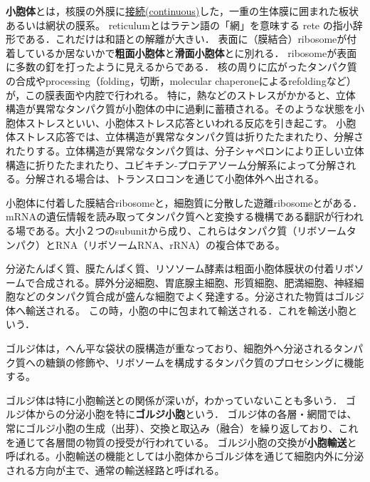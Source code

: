 \documentclass[uplatex, dvipdfmx]{jsreport}
\begin{document}
\begin{definition}
    \textbf{小胞体}とは，核膜の外膜に\underline{接続(continuous)}した，一重の生体膜に囲まれた板状あるいは網状の膜系。
    reticulumとはラテン語の「網」を意味する rete の指小辞形である．これだけは和語との解離が大きい．
    表面に（膜結合）ribosomeが付着しているか居ないかで\textbf{粗面小胞体}と\textbf{滑面小胞体}とに別れる．
    ribosomeが表面に多数の釘を打ったように見えるからである．
    核の周りに広がったタンパク質の合成やprocessing（folding，切断，molecular chaperoneによるrefoldingなど）が，この膜表面や内腔で行われる。
    特に，熱などのストレスがかかると、立体構造が異常なタンパク質が小胞体の中に過剰に蓄積される。そのような状態を小胞体ストレスといい、小胞体ストレス応答といわれる反応を引き起こす。
    小胞体ストレス応答では、立体構造が異常なタンパク質は折りたたまれたり、分解されたりする。立体構造が異常なタンパク質は、分子シャペロンにより正しい立体構造に折りたたまれたり、ユビキチン-プロテアソーム分解系によって分解される。分解される場合は、トランスロコンを通じて小胞体外へ出される。
\end{definition}
\begin{definition}
    小胞体に付着した膜結合ribosomeと，細胞質に分散した遊離ribosomeとがある．
    mRNAの遺伝情報を読み取ってタンパク質へと変換する機構である翻訳が行われる場である。大小２つのsubunitから成り、これらはタンパク質（リボソームタンパク）とRNA（リボソームRNA、rRNA）の複合体である。
\end{definition}

\begin{definition}[輸送小胞]
    分泌たんぱく質、膜たんぱく質、リソソーム酵素は粗面小胞体膜状の付着リボソームで合成される。膵外分泌細胞、胃底腺主細胞、形質細胞、肥満細胞、神経細胞などのタンパク質合成が盛んな細胞でよく発達する。分泌された物質はゴルジ体へ輸送される。
    この時，小胞の中に包まれて輸送される．これを輸送小胞という．
\end{definition}

\begin{definition}
    ゴルジ体は，へん平な袋状の膜構造が重なっており、細胞外へ分泌されるタンパク質への糖鎖の修飾や、リボソームを構成するタンパク質のプロセシングに機能する。
\end{definition}
\begin{remark}
    ゴルジ体は特に小胞輸送との関係が深いが，わかっていないことも多いう．
    ゴルジ体からの分泌小胞を特に\textbf{ゴルジ小胞}という．
    ゴルジ体の各層・網間では、常にゴルジ小胞の生成（出芽）、交換と取込み（融合）を繰り返しており、これを通じて各層間の物質の授受が行われている。
    ゴルジ小胞の交換が\textbf{小胞輸送}と呼ばれる。小胞輸送の機能としては小胞体からゴルジ体を通じて細胞内外に分泌される方向が主で、通常の輸送経路と呼ばれる。
\end{remark}
\end{document}
